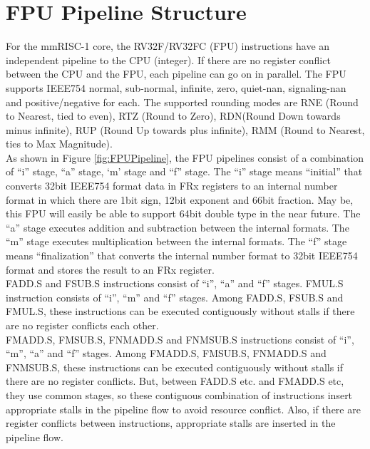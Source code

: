 \section{FPU Pipeline Structure}

For the mmRISC-1 core, the RV32F/RV32FC (FPU) instructions have an independent pipeline to the CPU (integer). If there are no register conflict between the CPU and the FPU, each pipeline can go on in parallel. The FPU supports IEEE754 normal, sub-normal, infinite, zero, quiet-nan, signaling-nan and positive/negative for each. The supported rounding modes are RNE (Round to Nearest, tied to even), RTZ (Round to Zero), RDN(Round Down towards minus infinite), RUP (Round Up towards plus infinite), RMM (Round to Nearest, ties to Max Magnitude).\\

As shown in Figure \ref{fig:FPUPipeline}, the FPU pipelines consist of a combination of “i” stage, “a” stage, ‘m’ stage and “f” stage. The “i” stage means “initial” that converts 32bit IEEE754 format data in FRx registers to an internal number format in which there are 1bit sign, 12bit exponent and 66bit fraction. May be, this FPU will easily be able to support 64bit double type in the near future. The “a” stage executes addition and subtraction between the internal formats. The “m” stage executes multiplication between the internal formats. The “f” stage means “finalization” that converts the internal number format to 32bit IEEE754 format and stores the result to an FRx register.\\

FADD.S and FSUB.S instructions consist of “i”, “a” and “f” stages. FMUL.S instruction consists of “i”, “m” and “f” stages. Among FADD.S, FSUB.S and FMUL.S, these instructions can be executed contiguously without stalls if there are no register conflicts each other.\\

FMADD.S, FMSUB.S, FNMADD.S and FNMSUB.S instructions consist of “i”, “m”, “a” and “f” stages. Among FMADD.S, FMSUB.S, FNMADD.S and FNMSUB.S, these instructions can be executed contiguously without stalls if there are no register conflicts. But, between FADD.S etc. and FMADD.S etc, they use common stages, so these contiguous combination of instructions insert appropriate stalls in the pipeline flow to avoid resource conflict. Also, if there are register conflicts between instructions, appropriate stalls are inserted in the pipeline flow.\\

